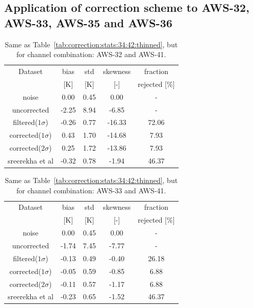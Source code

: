 \documentclass[12pt]{article}
\begin{document}
\subsection{Application of correction scheme to AWS-32, AWS-33, AWS-35 and AWS-36}
%


\begin{table}[!p]
	\centering
	\begin{tabular}[b]{c|c|c|c|c}
		Dataset  		  &   bias &   std & skewness & fraction \\
		&   [K]  &   [K] & [-] & rejected [\%]\\
		\hline
		noise             		&   0.00 &  0.45 &               0.00 &                - \\
		uncorrected       		&  -2.25 &  8.94 &              -6.85 &                 - \\
		filtered($1\sigma$)  	&  -0.26 &  0.77 &             -16.33 &               72.06 \\
		corrected($1\sigma$) 	&   0.43 &  1.70 &             -14.68 &                7.93 \\
		corrected($2\sigma$) 	&   0.25 &  1.72 &             -13.86 &                7.93 \\
		 sreerekha et al   		&  -0.32 &  0.78 &              -1.94 &               46.37 \\
		\hline
	\end{tabular}
	\caption{Same as Table~\ref{tab:correction:stats:34:42:thinned}, but for channel combination: AWS-32 and AWS-41.   }
	\label{tab:correction:stats:32:41}
\end{table}

\begin{table}[!p]
	\centering
	\begin{tabular}[b]{c|c|c|c|c}
		Dataset  		  &   bias &   std &  skewness  & fraction\\
		&   [K]  &   [K] & [-]  & rejected [\%]\\
		\hline
		noise       	    	&  0.00 &  0.45 &               0.00 &               - \\
		uncorrected	    		&  -1.74 &  7.45 &              -7.77 &                - \\
		filtered($1\sigma$)  	&  -0.13 &  0.49 &              -0.40 &               26.18 \\
		corrected($1\sigma$) 	&  -0.05 &  0.59 &              -0.85 &                6.88 \\
		corrected($2\sigma$) 	&  -0.11 &  0.57 &              -1.17 &                6.88 \\
		sreerekha et al         &  -0.23 &  0.65 &              -1.52 &               46.37 \\
		\hline
	\end{tabular}
	\caption{Same as Table~\ref{tab:correction:stats:34:42:thinned}, but for channel combination: AWS-33 and AWS-41.   }
	\label{tab:correction:stats:33:41}
\end{table}
\end{document}
